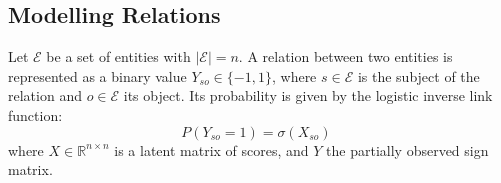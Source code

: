 \documentclass{article}
\newcommand{\proba}{P}
\newcommand{\complexSpace}{\mathbb{C}}
\renewcommand{\Re}{\mathbb{R}}
\newcommand{\C}{\complexSpace} %
\newcommand{\R}{\Re} %
\newcommand{\EntitySpace}{\mathcal{E}}
\newcommand{\Johans}[1]{\todo[inline,backgroundcolor=green!20!green]{Johans: #1}}
\begin{document}



\subsection{Modelling Relations}

Let $\EntitySpace$ be a set of entities with $|\EntitySpace|=n$. A relation between two entities is represented as a binary value $Y_{so}\in\{-1,1\}$, where $s\in\EntitySpace$ is the subject of the relation and $o\in\EntitySpace$ its object. Its probability is given by the logistic inverse link function:
\begin{equation}
    \proba(Y_{so}=1) = \sigma(X_{so})
    \enspace
    \label{observation-model0}
\end{equation}
where $X\in\R^{n\times n}$ is a latent matrix of scores, and $Y$ the partially observed sign matrix.
\end{document}
